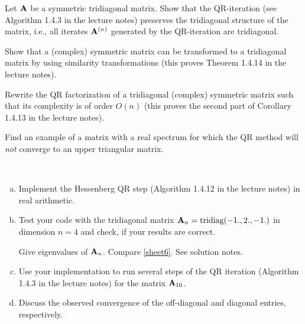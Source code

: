 
\begin{Sheet}
  \label{sheet4}

  \begin{Problem}
    Let $\mathbf A$ be a symmetric tridiagonal matrix. Show that the
    QR-iteration (see Algorithm 1.4.3 in the lecture notes) preserves
    the tridiagonal structure of the matrix, i.e., all iterates
    $\mathbf A^{(n)}$ generated by the QR-iteration are tridiagonal.
  \end{Problem}

  \begin{Problem}
    Show that a (complex) symmetric matrix can be transformed to a
    tridiagonal matrix by using similarity transformations (this
    proves Theorem 1.4.14 in the lecture notes).
  \end{Problem}

  \begin{Problem}
    Rewrite the QR factorization of a tridiagonal (complex) symmetric
    matrix such that its complexity is of order $O(n)$ (this proves
    the second part of Corollary 1.4.13 in the lecture notes).
  \end{Problem}

  \begin{Problem}
    Find an example of a matrix with a real spectrum for which the QR
    method will \textit{not} converge to an upper triangular matrix.
  \end{Problem}

  \begin{Problem}[Programming]
    \hfill\\\vspace{-6ex}
    \begin{enumerate}[(a)]
    \item Implement the Hessenberg QR step (Algorithm 1.4.12 in the
      lecture notes) in real arithmetic.
    \item Test your code with the tridiagonal matrix
      $\mathbf A_n=\operatorname{tridiag}(-1.,2.,-1.)$ in dimension $n=4$
      and check, if your results are correct.
      \begin{todo}
        Give eigenvalues of $\mathbf A_n$. Compare \cref{sheet6}. See
        solution notes.
      \end{todo}
    \item Use your implementation to run several steps of the QR
      iteration (Algorithm 1.4.3 in the lecture notes) for the matrix
      $\mathbf A_{10}$.
    \item Discuss the observed convergence of the off-diagonal and
      diagonal entries, respectively.
    \end{enumerate}
  \end{Problem}

\end{Sheet}


